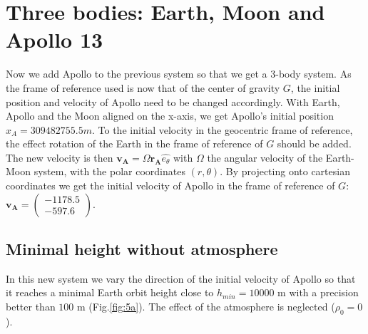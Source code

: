 \documentclass[a4paper,12pt,twoside]{article}
\begin{document}
\section{Three bodies: Earth, Moon and Apollo 13}
Now we add Apollo to the previous system so that we get a 3-body system. As the frame of reference used is now that of the center of gravity $G$, the initial position and velocity of Apollo need to be changed accordingly. With Earth, Apollo and the Moon aligned on the x-axis, we get Apollo's initial position $x_A = 309482755.5 m$. To the initial velocity in the geocentric frame of reference, the effect rotation of the Earth in the frame of reference of $G$ should be added. The new velocity is then $\mathbf{v_A}=\Omega \mathbf{r_A} \hat{e_{\theta}}$ with $\Omega$ the angular velocity of the Earth-Moon system, with the polar coordinates $(r,\theta)$. By projecting onto cartesian coordinates we get the initial velocity of Apollo in the frame of reference of $G$: $\mathbf{v_A}=\begin{pmatrix} \num{-1178.5} \\ \num{-597.6} \end{pmatrix}$.

\subsection{Minimal height without atmosphere} 
In this new system we vary the direction of the initial velocity of Apollo so that it reaches a minimal Earth orbit height close to $h_{min} = 10000$ m with a precision better than $100$ m (Fig.\ref{fig:5a}). The effect of the atmosphere is neglected ($\rho_0 = 0$).
\end{document}
